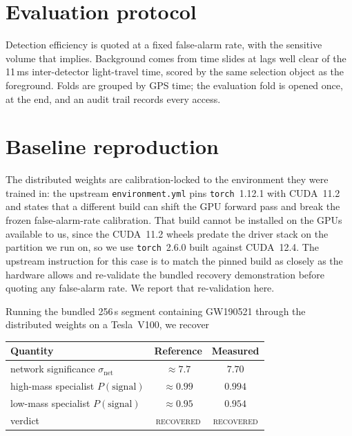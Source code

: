 \documentclass[11pt]{article}
\begin{document}
\section{Evaluation protocol}

Detection efficiency is quoted at a fixed false-alarm rate, with the sensitive volume
that implies. Background comes from time slides at lags well clear of the 11\,ms
inter-detector light-travel time, scored by the same selection object as the
foreground. Folds are grouped by GPS time; the evaluation fold is opened once, at the
end, and an audit trail records every access.

\section{Baseline reproduction}
\label{sec:repro}

The distributed weights are calibration-locked to the environment they were trained in:
the upstream \texttt{environment.yml} pins \texttt{torch}~1.12.1 with CUDA~11.2 and
states that a different build can shift the GPU forward pass and break the frozen
false-alarm-rate calibration. That build cannot be installed on the GPUs available to
us, since the CUDA~11.2 wheels predate the driver stack on the partition we run on, so
we use \texttt{torch}~2.6.0 built against CUDA~12.4. The upstream instruction for this
case is to match the pinned build as closely as the hardware allows and re-validate the
bundled recovery demonstration before quoting any false-alarm rate. We report that
re-validation here.

Running the bundled 256\,s segment containing GW190521 through the distributed weights
on a Tesla~V100, we recover

\begin{center}
\begin{tabular}{lcc}
\toprule
Quantity & Reference & Measured \\
\midrule
network significance $\sigma_\mathrm{net}$ & $\approx 7.7$ & $7.70$ \\
high-mass specialist $P(\mathrm{signal})$  & $\approx 0.99$ & $0.994$ \\
low-mass specialist $P(\mathrm{signal})$   & $\approx 0.95$ & $0.954$ \\
verdict & \textsc{recovered} & \textsc{recovered} \\
\bottomrule
\end{tabular}
\end{center}
\end{document}
